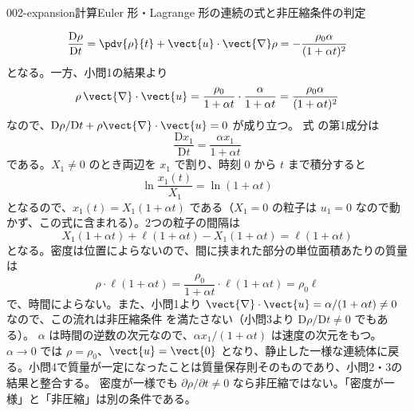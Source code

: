 \documentclass[uplatex,dvipdfmx,a4paper,11pt]{jsarticle}
\begin{document}
\begin{mondai}{002-expansion}{計算}{Euler 形・Lagrange 形の連続の式と非圧縮条件の判定}
\begin{tadashii}
\[ \frac{\mathrm{D}\rho}{\mathrm{D}t} = \pdv{\rho}{t} + \vect{u}\cdot\vect{\nabla}\rho = -\frac{\rho_0\alpha}{(1+\alpha t)^{2}} \]
となる。一方、小問1の結果より
\[ \rho\,\vect{\nabla}\cdot\vect{u} = \frac{\rho_0}{1+\alpha t}\cdot\frac{\alpha}{1+\alpha t} = \frac{\rho_0\alpha}{(1+\alpha t)^{2}} \]
なので、$\mathrm{D}\rho/\mathrm{D}t + \rho\vect{\nabla}\cdot\vect{u} = 0$ が成り立つ。
 式  の第1成分は
\[ \frac{\mathrm{D}x_1}{\mathrm{D}t} = \frac{\alpha x_1}{1+\alpha t} \]
である。$X_1 \neq 0$ のとき両辺を $x_1$ で割り、時刻 0 から $t$ まで積分すると
\[ \ln\frac{x_1(t)}{X_1} = \ln(1+\alpha t) \]
となるので、$x_1(t) = X_1(1+\alpha t)$ である（$X_1 = 0$ の粒子は $u_1 = 0$ なので動かず、この式に含まれる）。2つの粒子の間隔は
\[ X_1(1+\alpha t) + \ell(1+\alpha t) - X_1(1+\alpha t) = \ell(1+\alpha t) \]
となる。密度は位置によらないので、間に挟まれた部分の単位面積あたりの質量は
\[ \rho\cdot\ell(1+\alpha t) = \frac{\rho_0}{1+\alpha t}\cdot\ell(1+\alpha t) = \rho_0\ell \]
で、時間によらない。また、小問1より $\vect{\nabla}\cdot\vect{u} = \alpha/(1+\alpha t) \neq 0$ なので、この流れは非圧縮条件  を満たさない（小問3より $\mathrm{D}\rho/\mathrm{D}t \neq 0$ でもある）。
\kenzan $\alpha$ は時間の逆数の次元なので、$\alpha x_1/(1+\alpha t)$ は速度の次元をもつ。$\alpha\to0$ では $\rho = \rho_0$、$\vect{u} = \vect{0}$ となり、静止した一様な連続体に戻る。小問4で質量が一定になったことは質量保存則そのものであり、小問2・3の結果と整合する。
\tsumazuki 密度が一様でも $\partial\rho/\partial t \neq 0$ なら非圧縮ではない。「密度が一様」と「非圧縮」は別の条件である。
\end{tadashii}
\end{mondai}
\end{document}
